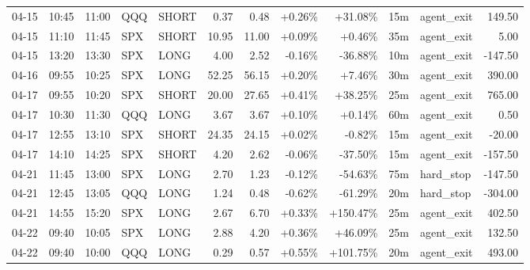 \documentclass[11pt,a4paper]{article}
\begin{document}
\begin{center}
\begin{longtable}{>{\color{txtmain}}l l l l l r r r r r >{\color{txtmain}}l r}
04-15 & 10:45 & 11:00 & QQQ & SHORT & 0.37 & 0.48 & \textcolor{wingreen}{+0.26\%} & \textcolor{wingreen}{+31.08\%} & 15m & agent\_exit & \textcolor{wingreen}{149.50} \\
04-15 & 11:10 & 11:45 & SPX & SHORT & 10.95 & 11.00 & \textcolor{wingreen}{+0.09\%} & \textcolor{wingreen}{+0.46\%} & 35m & agent\_exit & \textcolor{wingreen}{5.00} \\
04-15 & 13:20 & 13:30 & SPX & LONG & 4.00 & 2.52 & \textcolor{lossred}{-0.16\%} & \textcolor{lossred}{-36.88\%} & 10m & agent\_exit & \textcolor{lossred}{-147.50} \\
04-16 & 09:55 & 10:25 & SPX & LONG & 52.25 & 56.15 & \textcolor{wingreen}{+0.20\%} & \textcolor{wingreen}{+7.46\%} & 30m & agent\_exit & \textcolor{wingreen}{390.00} \\
04-17 & 09:55 & 10:20 & SPX & SHORT & 20.00 & 27.65 & \textcolor{wingreen}{+0.41\%} & \textcolor{wingreen}{+38.25\%} & 25m & agent\_exit & \textcolor{wingreen}{765.00} \\
04-17 & 10:30 & 11:30 & QQQ & LONG & 3.67 & 3.67 & \textcolor{wingreen}{+0.10\%} & \textcolor{wingreen}{+0.14\%} & 60m & agent\_exit & \textcolor{wingreen}{0.50} \\
04-17 & 12:55 & 13:10 & SPX & SHORT & 24.35 & 24.15 & \textcolor{wingreen}{+0.02\%} & \textcolor{lossred}{-0.82\%} & 15m & agent\_exit & \textcolor{lossred}{-20.00} \\
04-17 & 14:10 & 14:25 & SPX & SHORT & 4.20 & 2.62 & \textcolor{lossred}{-0.06\%} & \textcolor{lossred}{-37.50\%} & 15m & agent\_exit & \textcolor{lossred}{-157.50} \\
04-21 & 11:45 & 13:00 & SPX & LONG & 2.70 & 1.23 & \textcolor{lossred}{-0.12\%} & \textcolor{lossred}{-54.63\%} & 75m & hard\_stop & \textcolor{lossred}{-147.50} \\
04-21 & 12:45 & 13:05 & QQQ & LONG & 1.24 & 0.48 & \textcolor{lossred}{-0.62\%} & \textcolor{lossred}{-61.29\%} & 20m & hard\_stop & \textcolor{lossred}{-304.00} \\
04-21 & 14:55 & 15:20 & SPX & LONG & 2.67 & 6.70 & \textcolor{wingreen}{+0.33\%} & \textcolor{wingreen}{+150.47\%} & 25m & agent\_exit & \textcolor{wingreen}{402.50} \\
04-22 & 09:40 & 10:05 & SPX & LONG & 2.88 & 4.20 & \textcolor{wingreen}{+0.36\%} & \textcolor{wingreen}{+46.09\%} & 25m & agent\_exit & \textcolor{wingreen}{132.50} \\
04-22 & 09:40 & 10:00 & QQQ & LONG & 0.29 & 0.57 & \textcolor{wingreen}{+0.55\%} & \textcolor{wingreen}{+101.75\%} & 20m & agent\_exit & \textcolor{wingreen}{493.00} \\

\end{longtable}
\end{center}
\end{document}
